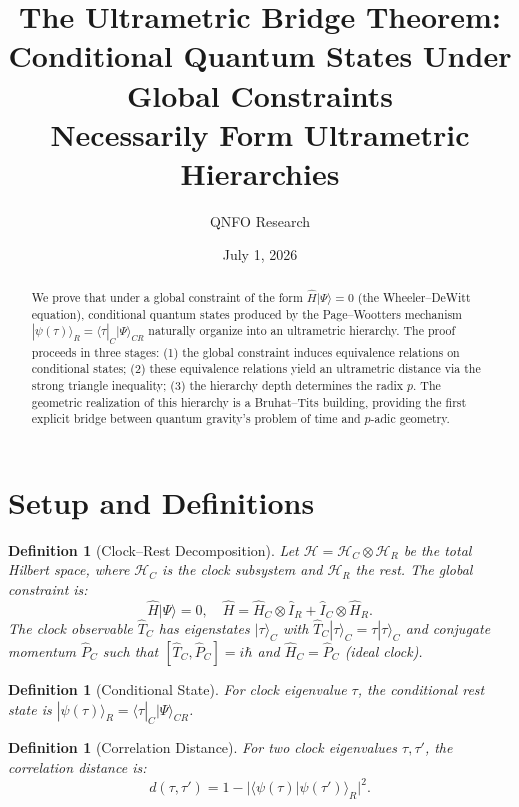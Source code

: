 \documentclass[12pt,a4paper]{article}
\title{The Ultrametric Bridge Theorem:\\Conditional Quantum States Under Global Constraints\\
Necessarily Form Ultrametric Hierarchies}
\author{QNFO Research}
\date{July 1, 2026}
\newtheorem{definition}[theorem]{Definition}
\newcommand{\cH}{\mathcal{H}}
\newcommand{\abs}[1]{\lvert#1\rvert}
\newcommand{\ket}[1]{|#1\rangle}
\newcommand{\bra}[1]{\langle #1|}
\newcommand{\braket}[2]{\langle #1 | #2 \rangle}
\begin{document}
\maketitle

\begin{abstract}
We prove that under a global constraint of the form $\hat{H}\ket{\Psi}=0$ (the Wheeler--DeWitt equation), conditional quantum states produced by the Page--Wootters mechanism $\ket{\psi(\tau)}_R = \bra{\tau}_C \ket{\Psi}_{CR}$ naturally organize into an ultrametric hierarchy. The proof proceeds in three stages: (1) the global constraint induces equivalence relations on conditional states; (2) these equivalence relations yield an ultrametric distance via the strong triangle inequality; (3) the hierarchy depth determines the radix $p$. The geometric realization of this hierarchy is a Bruhat--Tits building, providing the first explicit bridge between quantum gravity's problem of time and $p$-adic geometry.
\end{abstract}

\section{Setup and Definitions}

\begin{definition}[Clock--Rest Decomposition]
Let $\cH = \cH_C \otimes \cH_R$ be the total Hilbert space, where $\cH_C$ is the clock subsystem and $\cH_R$ the rest. The global constraint is:
\begin{equation}
\hat{H}\ket{\Psi} = 0, \quad \hat{H} = \hat{H}_C \otimes \hat{I}_R + \hat{I}_C \otimes \hat{H}_R.
\end{equation}
The clock observable $\hat{T}_C$ has eigenstates $\ket{\tau}_C$ with $\hat{T}_C \ket{\tau}_C = \tau \ket{\tau}_C$ and conjugate momentum $\hat{P}_C$ such that $[\hat{T}_C, \hat{P}_C] = i\hbar$ and $\hat{H}_C = \hat{P}_C$ (ideal clock).
\end{definition}

\begin{definition}[Conditional State]
For clock eigenvalue $\tau$, the conditional rest state is $\ket{\psi(\tau)}_R = \bra{\tau}_C \ket{\Psi}_{CR}$.
\end{definition}

\begin{definition}[Correlation Distance]
For two clock eigenvalues $\tau, \tau'$, the correlation distance is:
\begin{equation}
d(\tau, \tau') = 1 - \abs{\braket{\psi(\tau)}{\psi(\tau')}_R}^2.
\end{equation}
\end{definition}
\end{document}
